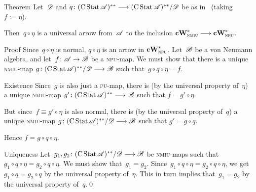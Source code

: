 \documentclass[a]{subfiles}
\begin{document}
\begin{parsec}
\begin{point}[cw-giry]{Theorem}
Let~$\mathscr{D}$ and $q\colon  (\operatorname{C}\operatorname{Stat}\mathscr{A})^{**}
\longrightarrow  (\operatorname{C}\operatorname{Stat}\mathscr{A})^{**}/\mathscr{D}$
be as in~
(taking $f:=\eta$).

Then~$q\circ \eta$ is a universal arrow from~$\mathscr{A}$
to the inclusion $\mathbf{cW}^*_{\text{\textsc{nmiu}}}\longrightarrow \mathbf{cW}^*_{\text{\textsc{npu}}}$.
\begin{point}{Proof}%
Since~$q\circ \eta$ is normal, $q\circ \eta$ is an arrow in
$\mathbf{cW}^*_{\text{\textsc{npu}}}$.
Let~$\mathscr{B}$ be a von Neumann algebra,
and let~$f\colon \mathscr{A}\to \mathscr{B}$
be a \textsc{npu}-map.
We must show that there is a unique \textsc{nmiu}-map
$g\colon 
(\operatorname{C}\operatorname{Stat}\mathscr{A})^{**}/\mathscr{D} \longrightarrow \mathscr{B}$
such that~$g\circ q\circ \eta = f$.
\begin{point}{Existence}
Since~$g$ is also just a \textsc{pu}-map,
there is (by the universal property of~$\eta$)
a unique \textsc{nmiu}-map $g'\colon 
(\operatorname{C}\operatorname{Stat}\mathscr{A})^{**} \longrightarrow \mathscr{B}$
such that $f=g'\circ \eta$.

But since~$f\equiv g'\circ \eta$ is also normal,
there is (by the universal property of~$q$) 
a unique \textsc{nmiu}-map $g\colon 
(\operatorname{C}\operatorname{Stat}\mathscr{A})^{**}/\mathscr{D} \longrightarrow \mathscr{B}$
such that $g'=g\circ q$. 

Hence $f=g\circ q \circ \eta$.
\end{point}
\begin{point}{Uniqueness}%
Let~$g_1,g_2\colon 
(\operatorname{C}\operatorname{Stat}\mathscr{A})^{**}/\mathscr{D} \longrightarrow \mathscr{B}$
be \textsc{nmiu}-maps
such that $g_1\circ q\circ \eta = g_2 \circ q \circ \eta$.
We must show that~$g_1=g_2$.
Since~$g_1\circ q \circ \eta = g_2 \circ q \circ \eta$,
we get  $g_1\circ q = g_2 \circ q$ by the universal property of~$\eta$.
This in turn implies that~$g_1=g_2$ by the universal property of~$q$.\qed
\end{point}
\end{point}
\end{point}
\end{parsec}
\end{document}
